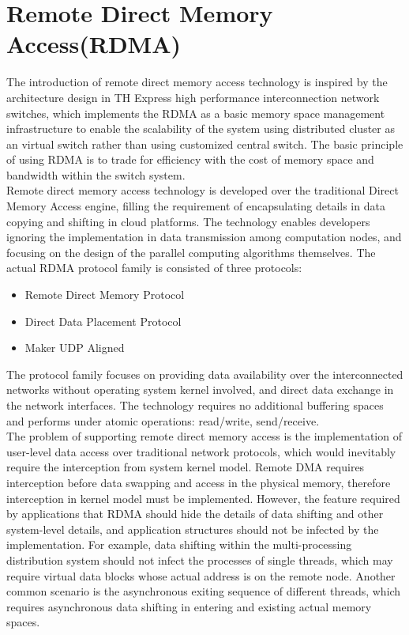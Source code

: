 \documentclass[11pt,openright,a4paper]{report}
\begin{document}
\section{Remote Direct Memory Access(RDMA)}
The introduction of remote direct memory access technology is inspired by the architecture design in TH Express high performance interconnection network switches, which implements the RDMA as a basic memory space management infrastructure to enable the scalability of the system using distributed cluster as an virtual switch rather than using customized central switch. The basic principle of using RDMA is to trade for efficiency with the cost of memory space and bandwidth within the switch system\cite{pinkerton2002case}.\\ 
Remote direct memory access technology is developed over the traditional Direct Memory Access engine, filling the requirement of encapsulating details in data copying and shifting in cloud platforms\cite{archer2012remote}. The technology enables developers ignoring the implementation in data transmission among computation nodes, and focusing on the design of the parallel computing algorithms themselves. The actual RDMA protocol family is consisted of three protocols:
\begin{itemize}
	\item Remote Direct Memory Protocol
	\item Direct Data Placement Protocol
	\item Maker UDP Aligned
\end{itemize}
The protocol family focuses on providing data availability over the interconnected networks without operating system kernel involved, and direct data exchange in the network interfaces. The technology requires no additional buffering spaces and performs under atomic operations: read/write, send/receive\cite{RobertRDMAintro}. \\
The problem of supporting remote direct memory access is the implementation of user-level data access over traditional network protocols, which would inevitably require the interception from system kernel model\cite{liu2004high}. Remote DMA requires interception before data swapping and access in the physical memory, therefore interception in kernel model must be implemented. However, the feature required by applications that RDMA should hide the details of data shifting and other system-level details, and application structures should not be infected by the implementation. For example, data shifting within the multi-processing distribution system should not infect the processes of single threads, which may require virtual data blocks whose actual address is on the remote node. Another common scenario is the asynchronous exiting sequence of different threads, which requires asynchronous data shifting in entering and existing actual memory spaces. \\
\end{document}
